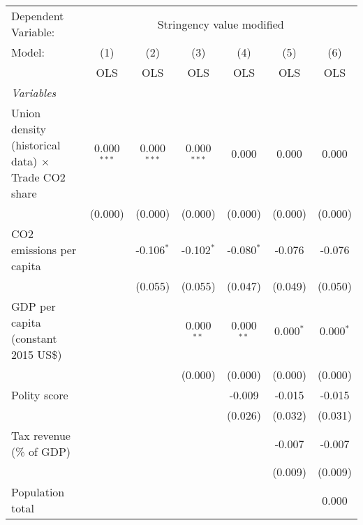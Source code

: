 
\begingroup
\centering
\begin{tabular}{lcccccc}
   \toprule
   Dependent Variable: & \multicolumn{6}{c}{Stringency value modified}\\
   Model:                                                    & (1)           & (2)           & (3)           & (4)          & (5)         & (6)\\  
                                                             &  OLS          & OLS           & OLS           & OLS          & OLS         & OLS\\  
   \midrule
   \emph{Variables}\\
   Union density (historical data) $\times$ Trade CO2 share  & 0.000$^{***}$ & 0.000$^{***}$ & 0.000$^{***}$ & 0.000        & 0.000       & 0.000\\   
                                                             & (0.000)       & (0.000)       & (0.000)       & (0.000)      & (0.000)     & (0.000)\\   
   CO2 emissions per capita                                  &               & -0.106$^{*}$  & -0.102$^{*}$  & -0.080$^{*}$ & -0.076      & -0.076\\   
                                                             &               & (0.055)       & (0.055)       & (0.047)      & (0.049)     & (0.050)\\   
   GDP per capita (constant 2015 US\$)                       &               &               & 0.000$^{**}$  & 0.000$^{**}$ & 0.000$^{*}$ & 0.000$^{*}$\\   
                                                             &               &               & (0.000)       & (0.000)      & (0.000)     & (0.000)\\   
   Polity score                                              &               &               &               & -0.009       & -0.015      & -0.015\\   
                                                             &               &               &               & (0.026)      & (0.032)     & (0.031)\\   
   Tax revenue (\% of GDP)                                   &               &               &               &              & -0.007      & -0.007\\   
                                                             &               &               &               &              & (0.009)     & (0.009)\\   
   Population total                                          &               &               &               &              &             & 0.000\\   

\end{tabular}
